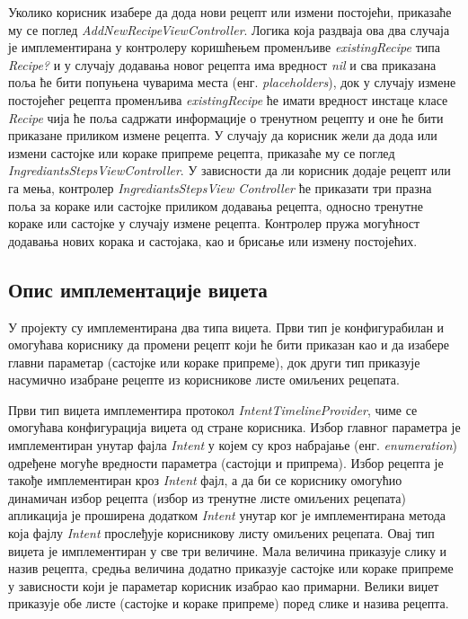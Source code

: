 \documentclass[12pt,oneside]{memoir}
\begin{document}
Уколико корисник изабере да дода нови рецепт или измени постојећи, приказаће му се поглед \textit{AddNewRecipeViewController}. Логика која раздваја ова два случаја је имплементирана у контролеру коришћењем променљиве \textit{existingRecipe} типа \textit{Recipe?} и у случају додавања новог рецепта има вредност \textit{nil} и сва приказана поља ће бити попуњена чуварима места (енг. \textit{placeholders}), док у случају измене постојећег рецепта променљива \textit{existingRecipe} ће имати вредност инстаце класе \textit{Recipe} чија ће поља садржати информације о тренутном рецепту и оне ће бити приказане приликом измене рецепта. У случају да корисник жели да дода или измени састојке или кораке припреме рецепта, приказаће му се поглед \textit{IngrediantsStepsViewController}. У зависности да ли корисник додаје рецепт или га мења, контролер \textit{IngrediantsStepsView Controller} ће приказати три празна поља за кораке или састојке приликом додавања рецепта, односно тренутне кораке или састојке у случају измене рецепта. Контролер пружа могућност додавања нових корака и састојака, као и брисање или измену постојећих.

\subsection{Опис имплементације виџета}

У пројекту су имплементирана два типа виџета. Први тип је конфигурабилан и омогућава кориснику да промени рецепт који ће бити приказан као и да изабере главни параметар (састојке или кораке припреме), док други тип приказује насумично изабране рецепте из корисникове листе омиљених рецепата.

Први тип виџета имплементира протокол \textit{IntentTimelineProvider}, чиме се омогућава конфигурација виџета од стране корисника. Избор главног параметра је имплементиран унутар фајла \textit{Intent} у којем су кроз набрајање (енг. \textit{enumeration}) одређене могуће вредности параметра (састојци и припрема). Избор рецепта је такође имплементиран кроз \textit{Intent} фајл, а да би се кориснику омогућио динамичан избор рецепта (избор из тренутне листе омиљених рецепата) апликација је проширена додатком \textit{Intent} унутар ког је имплементирана метода која фајлу \textit{Intent} прослеђује корисникову листу омиљених рецепата. Овај тип виџета је имплементиран у све три величине. Мала величина приказује слику и назив рецепта, средња величина додатно приказује састојке или кораке припреме у зависности који је параметар корисник изабрао као примарни. Велики виџет приказује обе листе (састојке и кораке припреме) поред слике и назива рецепта.
\end{document}
